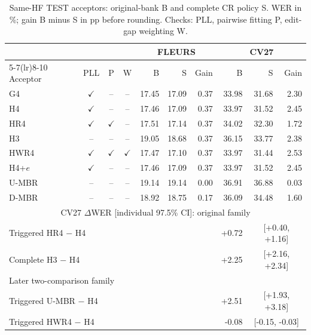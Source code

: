 \begin{table}[!b]\centering\footnotesize
\caption{Same-HF TEST acceptors: original-bank B and complete CR policy S. WER in \%; gain B minus S in pp before rounding. Checks: PLL, pairwise fitting P, edit-gap weighting W.}\label{tab:hfacceptors}
\setlength{\tabcolsep}{2pt}\renewcommand{\arraystretch}{1.03}
\begin{tabular}{@{}lcccrrrrrr@{}}\toprule
 & & & & \multicolumn{3}{c}{FLEURS} & \multicolumn{3}{c}{CV27}\\
\cmidrule(lr){5-7}\cmidrule(lr){8-10}
Acceptor & PLL & P & W & B & S & Gain & B & S & Gain\\\midrule
G4 & $\checkmark$ & -- & -- & 17.45 & 17.09 & 0.37 & 33.98 & 31.68 & 2.30\\
H4 & $\checkmark$ & -- & -- & 17.46 & 17.09 & 0.37 & 33.97 & 31.52 & 2.45\\
HR4 & $\checkmark$ & $\checkmark$ & -- & 17.51 & 17.14 & 0.37 & 34.02 & 32.30 & 1.72\\
H3 & -- & -- & -- & 19.05 & 18.68 & 0.37 & 36.15 & 33.77 & 2.38\\
HWR4 & $\checkmark$ & $\checkmark$ & $\checkmark$ & 17.47 & 17.10 & 0.37 & 33.97 & 31.44 & 2.53\\
H4+$e$ & $\checkmark$ & -- & -- & 17.46 & 17.09 & 0.37 & 33.97 & 31.52 & 2.45\\
U-MBR & -- & -- & -- & 19.14 & 19.14 & 0.00 & 36.91 & 36.88 & 0.03\\
D-MBR & -- & -- & -- & 18.92 & 18.75 & 0.17 & 36.09 & 34.48 & 1.60\\
\midrule\multicolumn{10}{c}{CV27 $\Delta$WER [individual 97.5\% CI]: original family}\\
\multicolumn{7}{l}{Triggered HR4 $-$ H4} & +0.72 & \multicolumn{2}{c}{[+0.40, +1.16]}\\
\multicolumn{7}{l}{Complete H3 $-$ H4} & +2.25 & \multicolumn{2}{c}{[+2.16, +2.34]}\\
\multicolumn{10}{l}{Later two-comparison family}\\
\multicolumn{7}{l}{Triggered U-MBR $-$ H4} & +2.51 & \multicolumn{2}{c}{[+1.93, +3.18]}\\
\multicolumn{7}{l}{Triggered HWR4 $-$ H4} & -0.08 & \multicolumn{2}{c}{[-0.15, -0.03]}\\
\bottomrule\end{tabular}\end{table}
